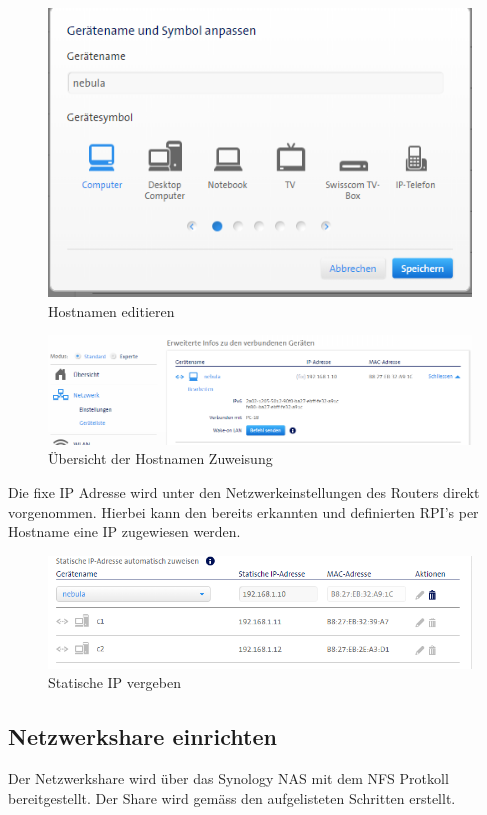 \begin{figure}[H]
	\centering
	\includegraphics[scale=0.8]{Bilder/hostnamen_mac_edit.png}
	\caption{Hostnamen editieren}
\end{figure}
\begin{figure}[H]
	\centering
	\includegraphics[scale=0.6]{Bilder/hostnamen_mac_overview.png}
	\caption{Übersicht der Hostnamen Zuweisung}
\end{figure}

Die fixe IP Adresse wird unter den Netzwerkeinstellungen des Routers direkt vorgenommen. Hierbei kann den bereits erkannten und definierten RPI's per Hostname eine IP zugewiesen werden.
\begin{figure}[H]
	\centering
	\includegraphics[scale=0.8]{Bilder/ip_mac_edit.png}
	\caption{Statische IP vergeben}
\end{figure}

\subsection{Netzwerkshare einrichten}
Der Netzwerkshare wird über das Synology NAS mit dem NFS Protkoll bereitgestellt. Der Share wird gemäss den aufgelisteten Schritten erstellt. \newline

